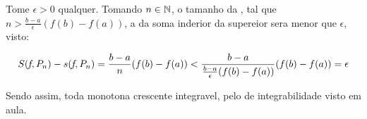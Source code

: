 Tome $\epsilon > 0$ qualquer. Tomando $n \in \mathbb{N}$, o tamanho da \particao, tal que \mbox{$n > \frac{b-a}{\epsilon}(f(b)-f(a))$}, \entao a \subtracao da soma inderior da supereior sera menor que $\epsilon$, visto:

$$
S(\mkern-2mu f\mkern-3mu,P_n) - s(\mkern-2mu f\mkern-3mu,P_n) = \frac{b-a}{n}(f(b)-f(a)) < \frac{b-a}{\frac{b-a}{\epsilon}(f(b)-f(a))}(f(b)-f(a)) = \epsilon
$$

Sendo assim, toda \funcao monotona crescente \eh integravel, pelo \criterio de integrabilidade visto em aula.


